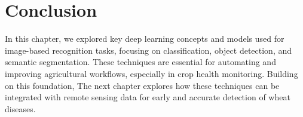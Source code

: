



\section{Conclusion}
In this chapter, we explored key deep learning concepts and models used for image-based recognition tasks, focusing on classification, object detection, and semantic segmentation. These techniques are essential for automating and improving agricultural workflows, especially in crop health monitoring. Building on this foundation, The next chapter explores how these techniques can be integrated with remote sensing data for early and accurate detection of wheat diseases.









